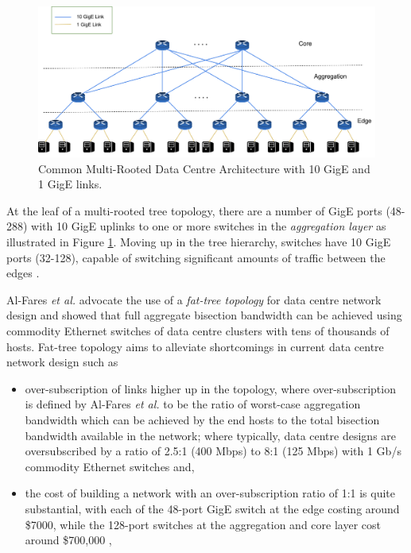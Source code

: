 \begin{figure}[!ht] 
	\centerline{\includegraphics[scale=0.30]{Multi-rootedArch.png}}
	\caption{Common Multi-Rooted Data Centre Architecture with 10 GigE and 1 GigE links.}
	\label{fig:MultiRootedArch}
\end{figure}

At the leaf of a multi-rooted tree topology, there are a number of GigE ports (48-288) with 10 GigE uplinks to one or more switches in the \textit{aggregation layer} \cite{al2008scalable} as illustrated in Figure \ref{fig:MultiRootedArch}. Moving up in the tree hierarchy, switches have 10 GigE ports (32-128), capable of switching significant amounts of traffic between the edges \cite{al2008scalable}. 

Al-Fares \textit{et al.} \cite{al2008scalable} advocate the use of a \textit{fat-tree topology} \cite{leiserson1985fat} for data centre network design and showed that full aggregate bisection bandwidth can be achieved using commodity Ethernet switches of data centre clusters with tens of thousands of hosts. Fat-tree topology aims to alleviate shortcomings in current data centre network design such as

\begin{itemize}

\item over-subscription of links higher up in the topology, where over-subscription is defined by  Al-Fares \textit{et al.} \cite{al2008scalable} to be the ratio of worst-case aggregation bandwidth which can be achieved by the end hosts to the total bisection bandwidth available in the network; where typically, data centre designs are oversubscribed by a ratio of 2.5:1 (400 Mbps) to 8:1 (125 Mbps) with 1 Gb/s commodity Ethernet switches \cite{headquarters2007cisco} and,   

\item the cost of building a network with an over-subscription ratio of 1:1 is quite substantial, with each of the 48-port GigE switch at the edge costing around \$7000, while the 128-port switches at the aggregation and core layer cost around \$700,000 \cite{al2008scalable},
\end{itemize}


